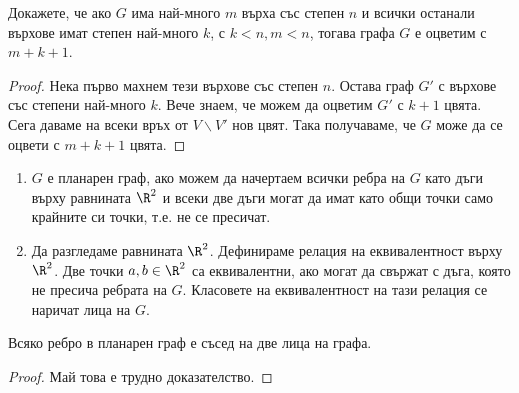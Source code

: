 \begin{problem}
  Докажете, че ако $G$ има най-много $m$ върха със степен $n$ и всички останали върхове имат степен най-много $k$, с $k<n, m<n$, тогава
  графа $G$ е оцветим с $m+k+1$.
\end{problem}
\begin{proof}
  Нека първо махнем тези върхове със степен $n$. 
  Остава граф $G'$ с върхове със степени най-много $k$.
  Вече знаем, че можем да оцветим $G'$ с $k+1$ цвята.
  Сега даваме на всеки връх от $V\backslash V'$ нов цвят.
  Така получаваме, че $G$ може да се оцвети с $m+k+1$ цвята.
\end{proof}



\begin{dfn}
  \begin{enumerate}
  \item
    $G$ е планарен граф, ако можем да начертаем всички ребра на $G$ като дъги върху равнината $\R^2$
    и всеки две дъги могат да имат като общи точки само крайните си точки, т.е. не се пресичат.
  \item{}
    Да разгледаме равнината $\R^2$. Дефинираме релация на еквивалентност върху $\R^2$.
    Две точки $a,b\in \R^2$ са еквивалентни, ако могат да свържат с дъга, която не пресича ребрата на $G$.
    Класовете на еквивалентност на тази релация се наричат лица на $G$.
\end{enumerate}

\end{dfn}

\begin{lemma}
  Всяко ребро в планарен граф е съсед на две лица на графа.
\end{lemma}
\begin{proof}
  Май това е трудно доказателство.
\end{proof}



